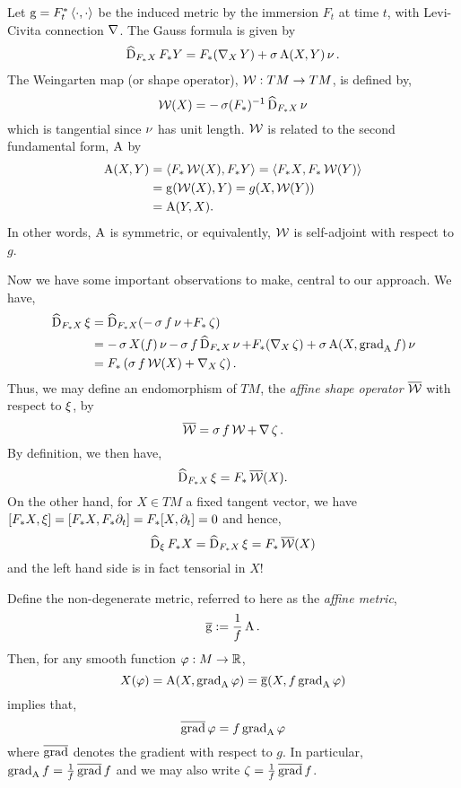 \documentclass{amsart}
\begin{document}
Let $\g = F_t^{\ast} \bgg$ be the induced metric by the immersion \(F_t\) at time \(t\), with Levi-Civita connection \(\operatorname{\nabla}\). The Gauss formula is given by
\begin{align}\label{gauss equ}
\operatorname{\widehat{D}}_{F_{\ast} X} F_{\ast} Y = F_{\ast}(\operatorname{\nabla}_X Y) + \operatorname{\sigma} \operatorname{A}(X,Y) \operatorname{\nu}.
\end{align}
The Weingarten map (or shape operator), \(\operatorname{\mathcal{W}} : TM \to TM\), is defined by,
\[
\operatorname{\mathcal{W}}(X) = -\operatorname{\sigma} (F_{\ast})^{-1} \operatorname{\widehat{D}}_{F_{\ast} X} \operatorname{\nu}
\]
which is tangential since \(\operatorname{\nu}\) has unit length. \(\operatorname{\mathcal{W}}\) is related to the second fundamental form, \(\operatorname{A}\) by
\[
\begin{split}
\sff(X, Y) &= \bgg[F_{\ast} \weingarten(X)][F_{\ast} Y] = \bgg[F_{\ast} X][F_{\ast} \weingarten(Y)] \\
&= \g(\weingarten(X), Y) = g(X, \weingarten(Y)) \\
&= \sff(Y, X).
\end{split}
\]
In other words, \(\operatorname{A}\) is symmetric, or equivalently, \(\operatorname{\mathcal{W}}\) is self-adjoint with respect to \(g\).

Now we have some important observations to make, central to our approach. We have,
\begin{align*}
\operatorname{\widehat{D}}_{F_{\ast}X} \operatorname{\xi} &= \operatorname{\widehat{D}}_{F_{\ast}X} (- \operatorname{\sigma} f \operatorname{\nu} + F_{\ast}\operatorname{\zeta}) \\
&= -\operatorname{\sigma} X(f) \operatorname{\nu} - \operatorname{\sigma} f \operatorname{\widehat{D}}_{F_{\ast}X} \operatorname{\nu} + F_{\ast}(\operatorname{\nabla}_X \operatorname{\zeta}) + \operatorname{\sigma} \operatorname{A} (X, \operatorname{grad}_{\operatorname{A}} f) \operatorname{\nu} \\
&= F_{\ast} \left(\operatorname{\sigma} f \operatorname{\mathcal{W}} (X) + \operatorname{\nabla}_X \operatorname{\zeta}\right).
\end{align*}
Thus, we may define an endomorphism of $TM$, the \emph{affine shape operator} $\operatorname{\overline{\operatorname{\mathcal{W}}}}$ with respect to $\operatorname{\xi}$, by
\begin{equation}
\label{eq:affshape}
\affshape = \sig f \weingarten + \D \tangvel.
\end{equation}
By definition, we then have,
\[
\operatorname{\widehat{D}}_{F_{\ast} X} \operatorname{\xi} = F_{\ast} \operatorname{\overline{\operatorname{\mathcal{W}}}}(X).
\]
On the other hand, for \(X \in TM\) a fixed tangent vector, we have \([F_{\ast} X, \operatorname{\xi}] = [F_{\ast} X, F_{\ast} \partial_t] = F_{\ast} [X, \partial_t] = 0\) and hence,
\[
\operatorname{\widehat{D}}_{\operatorname{\xi}} F_{\ast} X = \operatorname{\widehat{D}}_{F_{\ast} X} \operatorname{\xi} = F_{\ast} \operatorname{\overline{\operatorname{\mathcal{W}}}}(X)
\]
and the left hand side is in fact tensorial in \(X\)!

Define the non-degenerate metric, referred to here as the \emph{affine metric},
\begin{equation}
\label{eq:affg}
\affg := \frac{1}{f} \sff.
\end{equation}
Then, for any smooth function $\varphi : M \to \mathbb{R}$,
\[
X(\varphi) = \operatorname{A}(X, \operatorname{grad}_{\operatorname{A}} \varphi) = \operatorname{\overline{\operatorname{g}}}(X, f \operatorname{grad}_{\operatorname{A}} \varphi)
\]
implies that,
\[
\operatorname{\overline{\operatorname{grad}}} \varphi = f \operatorname{grad}_{\operatorname{A}} \varphi
\]
where $\operatorname{\overline{\operatorname{grad}}}$ denotes the gradient with respect to $g$. In particular, $\operatorname{grad}_{\operatorname{A}} f = \tfrac{1}{f} \operatorname{\overline{\operatorname{grad}}} f$ and we may also write $\operatorname{\zeta} = \tfrac{1}{f} \operatorname{\overline{\operatorname{grad}}} f$.
\end{document}
